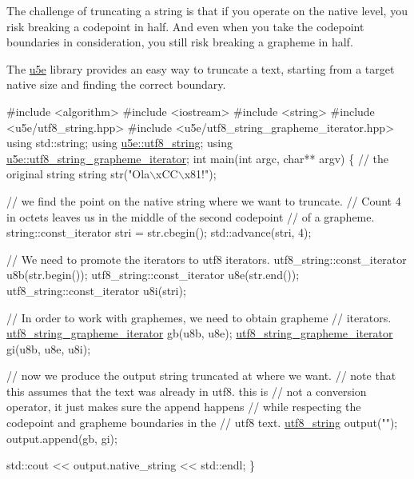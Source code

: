 The challenge of truncating a string is that if you operate on the native level, you risk breaking a codepoint in half. And even when you take the codepoint boundaries in consideration, you still risk breaking a grapheme in half.

The \hyperlink{namespaceu5e}{u5e} library provides an easy way to truncate a text, starting from a target native size and finding the correct boundary.


\begin{DoxyCode}
\textcolor{preprocessor}{#include <algorithm>}
\textcolor{preprocessor}{#include <iostream>}
\textcolor{preprocessor}{#include <string>}
\textcolor{preprocessor}{#include <u5e/utf8\_string.hpp>}
\textcolor{preprocessor}{#include <u5e/utf8\_string\_grapheme\_iterator.hpp>}
\textcolor{keyword}{using} std::string;
\textcolor{keyword}{using} \hyperlink{namespaceu5e_a3814526c6ea7ca04223a8ec1b662d497}{u5e::utf8\_string};
\textcolor{keyword}{using} \hyperlink{namespaceu5e_a74a084fc31e6af27114007a21f6f89e7}{u5e::utf8\_string\_grapheme\_iterator};
\textcolor{keywordtype}{int} main(\textcolor{keywordtype}{int} argc, \textcolor{keywordtype}{char}** argv) \{
  \textcolor{comment}{// the original string}
  \textcolor{keywordtype}{string} str(\textcolor{stringliteral}{"Ola\(\backslash\)xCC\(\backslash\)x81!"});

  \textcolor{comment}{// we find the point on the native string where we want to truncate.}
  \textcolor{comment}{// Count 4 in octets leaves us in the middle of the second codepoint}
  \textcolor{comment}{// of a grapheme.}
  string::const\_iterator stri = str.cbegin();
  std::advance(stri, 4);

  \textcolor{comment}{// We need to promote the iterators to utf8 iterators.}
  utf8\_string::const\_iterator u8b(str.begin());
  utf8\_string::const\_iterator u8e(str.end());
  utf8\_string::const\_iterator u8i(stri);

  \textcolor{comment}{// In order to work with graphemes, we need to obtain grapheme}
  \textcolor{comment}{// iterators.}
  \hyperlink{namespaceu5e_a74a084fc31e6af27114007a21f6f89e7}{utf8\_string\_grapheme\_iterator} gb(u8b, u8e);
  \hyperlink{namespaceu5e_a74a084fc31e6af27114007a21f6f89e7}{utf8\_string\_grapheme\_iterator} gi(u8b, u8e, u8i);
  
  \textcolor{comment}{// now we produce the output string truncated at where we want.}
  \textcolor{comment}{// note that this assumes that the text was already in utf8. this is}
  \textcolor{comment}{// not a conversion operator, it just makes sure the append happens}
  \textcolor{comment}{// while respecting the codepoint and grapheme boundaries in the}
  \textcolor{comment}{// utf8 text.}
  \hyperlink{namespaceu5e_a3814526c6ea7ca04223a8ec1b662d497}{utf8\_string} output(\textcolor{stringliteral}{""});
  output.append(gb, gi);

  std::cout << output.native\_string << std::endl;
\}
\end{DoxyCode}
 